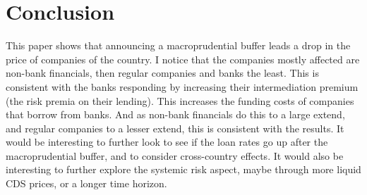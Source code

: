 \documentclass[11pt]{article}
\newcommand\fnote[1]{\captionsetup{font=small}\caption*{#1}}
\begin{document}
\iffalse
\subsection{Robustness Checks}

Robust to computing CAR using cumulative product instead of cumulative sums, as the results look almost identical, as can be seen from figure \ref{fig:eventAbnCump}.



\begin{figure}%
	\centering
	\includegraphics%
	{./figures/retabncum.pdf}
	\caption{Cumulative Abnormal Returns - Event}
	\label{fig:eventAbnCump}
	\fnote{Cumulated using products. Event means an increase in the macroprudential buffer of 0.5 percentage point or higher. Blue line and grey area denotes fit and 90\% confidence bands using the Loess method. Triangles signify daily means.}
\end{figure}
\fi

\section{Conclusion} \label{sec:conclusion}
This paper shows that announcing a macroprudential buffer leads a drop in the price of companies of the country. I notice that the companies mostly affected are non-bank financials, then regular companies and banks the least. This is consistent with the banks responding by increasing their intermediation premium (the risk premia on their lending). This increases the funding costs of companies that borrow from banks. And as non-bank financials do this to a large extend, and regular companies to a lesser extend, this is consistent with the results. It would be interesting to further look to see if the loan rates go up after the macroprudential buffer, and to consider cross-country effects. It would also be interesting to further explore the systemic risk aspect, maybe through more liquid CDS prices, or a longer time horizon.
\end{document}
